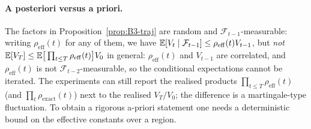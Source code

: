 \paragraph{A posteriori versus a priori.}
The factors in Proposition~\ref{prop:B3-traj} are random and $\mathcal F_{t-1}$-measurable: writing $\rho_{\mathrm{eff}}(t)$ for any of them, we have $\mathbb{E}[V_t\mid\mathcal F_{t-1}]\le\rho_{\mathrm{eff}}(t)V_{t-1}$, but \emph{not} $\mathbb{E}[V_T]\le\mathbb{E}\big[\prod_{t\le T}\rho_{\mathrm{eff}}(t)\big]V_0$ in general: $\rho_{\mathrm{eff}}(t)$ and $V_{t-1}$ are correlated, and $\rho_{\mathrm{eff}}(t)$ is not $\mathcal F_{t-2}$-measurable, so the conditional expectations cannot be iterated. The experiments can still report the realised products $\prod_{t\le T}\rho_{\mathrm{eff}}(t)$ (and $\prod_t\rho_{\mathrm{exact}}(t)$) next to the realised $V_T/V_0$; the difference is a martingale-type fluctuation. To obtain a rigorous a-priori statement one needs a deterministic bound on the effective constants over a region.

